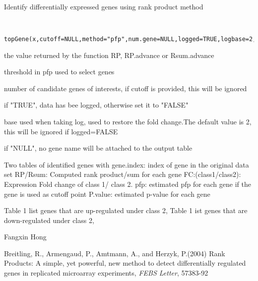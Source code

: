 \begin{Description}\relax
Identify differentially expressed genes using 
rank product method
\end{Description}
\begin{Usage}
\begin{verbatim}

     topGene(x,cutoff=NULL,method="pfp",num.gene=NULL,logged=TRUE,logbase=2,gene.names=NULL)\end{verbatim}
\end{Usage}
\begin{Arguments}
\begin{ldescription}
\item[\code{x}] the value returned by the 
function RP, RP.advance or
Rsum.advance 
\item[\code{cutoff}] threshold in pfp used to select genes
\item[\code{method}] 
\item[\code{num.gene}] number of candidate genes of interests, 
if cutoff is provided, this will be ignored
\item[\code{logged}] if "TRUE", data has bee logged, otherwise set it 
to "FALSE"
\item[\code{logbase}] base used when taking log, used to restore the 
fold change.The default value is 2, this will be 
ignored if logged=FALSE
\item[\code{gene.names}] if "NULL", no gene name will be 
attached to the output table
\end{ldescription}
\end{Arguments}
\begin{Value}
Two tables of identified genes with 
gene.index: index of gene in the original data set 
RP/Rsum: Computed rank product/sum for each gene
FC:(class1/class2): Expression Fold change of class 1/ class 2.                   
pfp: estimated pfp for each gene if the gene is used as cutoff point
P.value: estimated p-value for each gene 

Table 1 list genes that are up-regulated under class 2, Table 1 ist 
genes that are down-regulated under class 2,
\end{Value}
\begin{Author}\relax
Fangxin Hong 
\end{Author}
\begin{References}\relax
Breitling, R., Armengaud, P., Amtmann, A., and Herzyk, 
P.(2004) Rank Products: A simple, yet powerful, new method 
to detect differentially regulated genes in
replicated microarray experiments, \emph{FEBS Letter}, 57383-92
\end{References}

